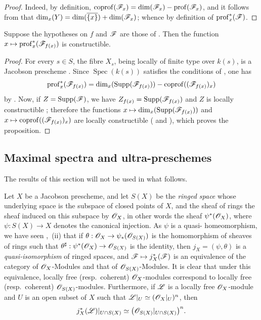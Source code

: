 \begin{proof}
Indeed, by definition, $\operatorname{coprof}(\mathscr{F}_x)=\dim(\mathscr{F}_x)-\operatorname{prof}(\mathscr{F}_x)$, and it follows from  that $\dim_x(Y)=\dim(\overline{\{x\}})+\dim(\mathscr{F}_x)$; whence  by definition of $\operatorname{prof}^*_x(\mathscr{F})$.
\end{proof}

\begin{corollary}[10.8.8]
\label{IV.10.8.8}
Suppose the hypotheses on $f$ and $\mathscr{F}$ are those of . Then the function $x\mapsto\operatorname{prof}^*_x(\mathscr{F}_{f(x)})$ is constructible.
\end{corollary}

\begin{proof}
For every $s\in S$, the fibre $X_s$, being locally of finite type over $k(s)$, is a Jacobson prescheme . Since $\operatorname{Spec}(k(s))$ satisfies the conditions of , one has
\[
  \operatorname{prof}^*_x(\mathscr{F}_{f(x)})
  =\dim_x(\operatorname{Supp}(\mathscr{F}_{f(x)}))
   -\operatorname{coprof}((\mathscr{F}_{f(x)})_x)
\]
by .
Now, if $Z=\operatorname{Supp}(\mathscr{F})$, we have $Z_{f(x)}=\operatorname{Supp}(\mathscr{F}_{f(x)})$  and $Z$ is locally constructible ; therefore the functions $x\mapsto\dim_x(\operatorname{Supp}(\mathscr{F}_{f(x)}))$ and $x\mapsto\operatorname{coprof}((\mathscr{F}_{f(x)})_x)$ are locally constructible ( and ), which proves the proposition.
\end{proof}

\subsection{Maximal spectra and ultra-preschemes}
\label{subsection:IV.10.9}

The results of this section will not be used in what follows.

\begin{env}[10.9.1]
\label{IV.10.9.1}
Let $X$ be a Jacobson prescheme, and let $S(X)$ be the \emph{ringed space} whose underlying space is the subspace of closed points of $X$, and the sheaf of rings the sheaf induced on this subspace by $\mathscr{O}_X$, in other words the sheaf $\psi^*(\mathscr{O}_X)$, where $\psi:S(X)\to X$ denotes the canonical injection.
As $\psi$ is a quasi-
homeomorphism, we have seen ,~(ii) that if $\theta:\mathscr{O}_X\to\psi_*(\mathscr{O}_{S(X)})$ is the homomorphism of sheaves of rings such that $\theta^\sharp:\psi^*(\mathscr{O}_X)\to\mathscr{O}_{S(X)}$ is the identity, then $j_X=(\psi,\theta)$ is a \emph{quasi-isomorphism} of ringed spaces, and $\mathscr{F}\mapsto j_X^*(\mathscr{F})$ is an equivalence of the category of $\mathscr{O}_X$-Modules and that of $\mathscr{O}_{S(X)}$-Modules.
It is clear that under this equivalence, locally free (resp.\ coherent) $\mathscr{O}_X$-modules correspond to locally free (resp.\ coherent) $\mathscr{O}_{S(X)}$-modules. Furthermore, if $\mathscr{L}$ is a locally free $\mathscr{O}_X$-module and $U$ is an open subset of $X$ such that $\mathscr{L}|_U\simeq(\mathscr{O}_X|_U)^n$, then
\[
  j_X^*(\mathscr{L})|_{U\cap S(X)}
  \simeq \bigl(\mathscr{O}_{S(X)}|_{U\cap S(X)}\bigr)^n.
\]
\end{env}

